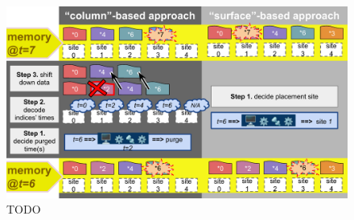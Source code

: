 \begin{figure}
  \centering
  \includegraphics[width=\linewidth]{img/surf-vs-column-schematic}
  \caption{TODO}
  \label{fig:surf-vs-column-schematic}
\end{figure}

